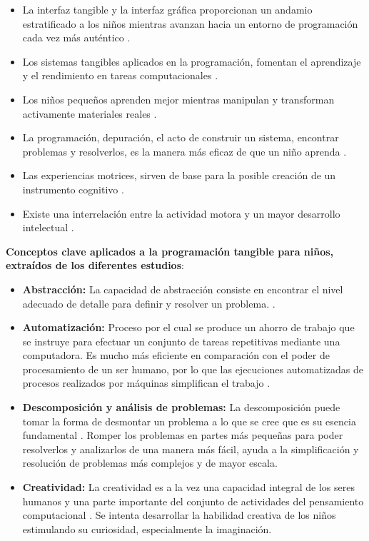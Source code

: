 \begin{itemize}
\item La interfaz tangible y la interfaz gráfica proporcionan un andamio estratificado a los niños mientras avanzan hacia un entorno de programación cada vez más auténtico \cite{Horn}. 

\item Los sistemas tangibles aplicados en la programación, fomentan el aprendizaje y el rendimiento en tareas computacionales \cite{Sapounidis}.

\item Los niños pequeños aprenden mejor mientras manipulan y transforman activamente materiales reales \cite{Beaty}.

\item La programación, depuración, el acto de construir un sistema, encontrar problemas y resolverlos, es la manera más eficaz de que un niño aprenda \cite{Papert}.

\item Las experiencias motrices, sirven de base para la posible creación de un instrumento cognitivo \cite{Zimmer}.  

\item Existe una interrelación entre la actividad motora y un mayor desarrollo intelectual \cite{Zahner}.

\end{itemize}

\textbf{Conceptos clave aplicados a la programación tangible para niños, extraídos de los diferentes estudios}:
\begin{itemize}
\item \textbf{Abstracción:} La capacidad de abstracción consiste en encontrar el nivel adecuado de detalle para definir y resolver un problema. \cite{Heureux}.
\item \textbf{Automatización:} Proceso por el cual se produce un ahorro de trabajo que se instruye para efectuar un conjunto de tareas repetitivas mediante una computadora. Es mucho más eficiente en comparación con el poder de procesamiento de un ser humano, por lo que las ejecuciones automatizadas de procesos realizados por máquinas simplifican el trabajo \cite{Guzdial}.
\item \textbf{Descomposición y análisis de problemas:} La descomposición puede tomar la forma de desmontar un problema a lo que se cree que es su esencia fundamental \cite{Lee}. Romper los problemas en partes más pequeñas para poder resolverlos y analizarlos de una manera más fácil, ayuda a la simplificación y resolución de problemas más complejos y de mayor escala.
\item \textbf{Creatividad:} La creatividad es a la vez una capacidad integral de los seres humanos y una parte importante del conjunto de actividades del pensamiento computacional \cite{Curzon}. Se intenta desarrollar la habilidad creativa de los niños estimulando su curiosidad, especialmente la imaginación.
\end{itemize}



